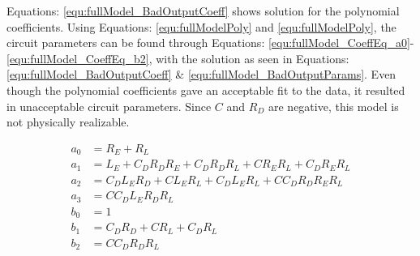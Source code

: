 

Equations: \eqref{equ:fullModel_BadOutputCoeff} shows solution for the polynomial coefficients. Using Equations: \eqref{equ:fullModelPoly} and \eqref{equ:fullModelPoly}, the circuit parameters can be found through Equations: \eqref{equ:fullModel_CoeffEq_a0}-\eqref{equ:fullModel_CoeffEq_b2}, with the solution as seen in Equations: \eqref{equ:fullModel_BadOutputCoeff} \& \eqref{equ:fullModel_BadOutputParams}.
Even though the polynomial coefficients gave an acceptable fit to the data, it resulted in unacceptable circuit parameters. Since $C$ and $R_D$ are negative, this model is not physically realizable.

\begin{align}
     a_0 &= R_E + R_L                                         \label{equ:fullModel_CoeffEq_a0} \\
     a_1 &= L_E + C_DR_DR_E + C_DR_DR_L + CR_ER_L + C_DR_ER_L \label{equ:fullModel_CoeffEq_a1} \\
     a_2 &= C_DL_ER_D + CL_ER_L + C_DL_ER_L + CC_DR_DR_ER_L   \label{equ:fullModel_CoeffEq_a2} \\
     a_3 &= CC_DL_ER_DR_L                                     \label{equ:fullModel_CoeffEq_a3} \\
     b_0 &= 1                                                 \label{equ:fullModel_CoeffEq_b0} \\
     b_1 &= C_DR_D + CR_L + C_DR_L                            \label{equ:fullModel_CoeffEq_b1} \\
     b_2 &= CC_DR_DR_L                                        \label{equ:fullModel_CoeffEq_b2}
\end{align}

